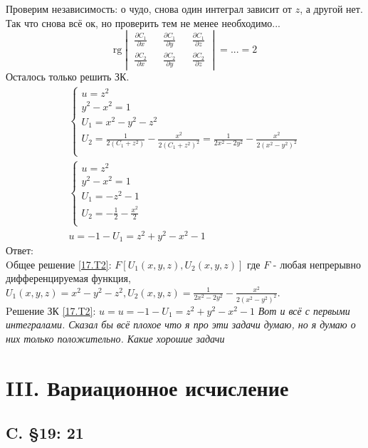 \documentclass{article}
\newcommand{\rg}{\text{rg}}
\begin{document}
Проверим независимость: о чудо, снова один интеграл зависит от $z$, а другой нет. Так что снова всё ок, но проверить тем не менее необходимо...
\begin{equation*}
    \rg \begin{vmatrix}
        \frac{\partial C_1}{\partial x} && \frac{\partial C_1}{\partial y} && \frac{\partial C_1}{\partial z}\\
        \frac{\partial C_2}{\partial x} && \frac{\partial C_2}{\partial y} && \frac{\partial C_2}{\partial z}
    \end{vmatrix} = ... = 2
\end{equation*}
Осталось только решить ЗК.
\begin{gather*}
\begin{cases}
        u=z^2\\
        y^2-x^2=1\\
        U_1= x^2-y^2-z^2\\
        U_2=\frac{1}{2 \left(C_1+z^2\right)}-\frac{x^2}{2 \left(C_1+z^2\right)^2} = \frac{1}{2x^2-2y^2} - \frac{x^2}{2 \left(x^2-y^2\right)^2}\\
    \end{cases}    \\
    \begin{cases}
        u=z^2\\
        y^2-x^2=1\\
        U_1=-z^2-1\\
        U_2=- \frac{1}{2} - \frac{x^2}{2}\\
    \end{cases}    \\
    u=-1-U_1=z^2+y^2-x^2-1
\end{gather*}
Ответ:\\
 Oбщее решение \ref{17.T2}: $F[U_1(x,y,z),U_2(x,y,z)]$ где $F$ - любая непрерывно дифференцируемая функция, $U_1(x,y,z)=x^2-y^2-z^2, U_2(x,y,z)= \frac{1}{2x^2-2y^2} - \frac{x^2}{2 \left(x^2-y^2\right)^2}$.\\
 Pешение ЗК \ref{17.T2}: $u= u=-1-U_1=z^2+y^2-x^2-1$ 
  \textcolor[rgb]{0.480469,0.566406,0.480469}{\textit{Вот и всё с первыми интегралами. Сказал бы всё плохое что я про эти задачи думаю, но я думаю о них только положительно. Какие хорошие задачи}}                                               

\section{III. Вариационное исчисление}
\subsection{C. \S19: 21}
\end{document}
